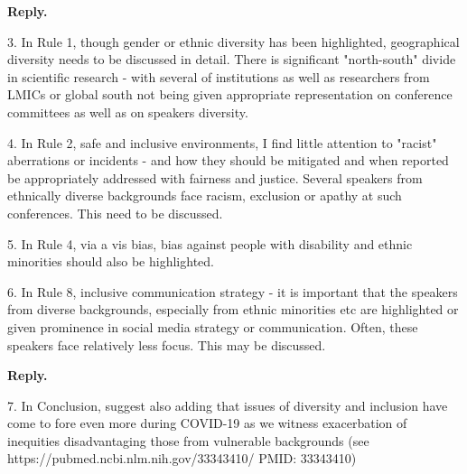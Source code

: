 \documentclass{article}
\newenvironment{Reply}{\noindent\color{BlueViolet}\textbf{Reply.}}{\vspace{1em}}
\begin{document}
\begin{Reply}
\end{Reply}

3. In Rule 1, though gender or ethnic diversity has been highlighted, geographical diversity needs to be discussed in detail. There is significant "north-south" divide in scientific research - with several of institutions as well as researchers from LMICs or global south not being given appropriate representation on conference committees as well as on speakers diversity.

4. In Rule 2, safe and inclusive environments, I find little attention to "racist" aberrations or incidents - and how they should be mitigated and when reported be appropriately addressed with fairness and justice.
Several speakers from ethnically diverse backgrounds face racism, exclusion or apathy at such conferences. This need to be discussed.

5. In Rule 4, via a vis bias, bias against people with disability and ethnic minorities should also be highlighted.

6. In Rule 8, inclusive communication strategy - it is important that the speakers from diverse backgrounds, especially from ethnic minorities etc are highlighted or given prominence in social media strategy or communication. Often, these speakers face relatively less focus. This may be discussed.

\begin{Reply}
\end{Reply}

7. In Conclusion, suggest also adding that issues of diversity and inclusion have come to fore even more during COVID-19 as we witness exacerbation of inequities disadvantaging those from vulnerable backgrounds (see https://pubmed.ncbi.nlm.nih.gov/33343410/
PMID: 33343410)
\end{document}
